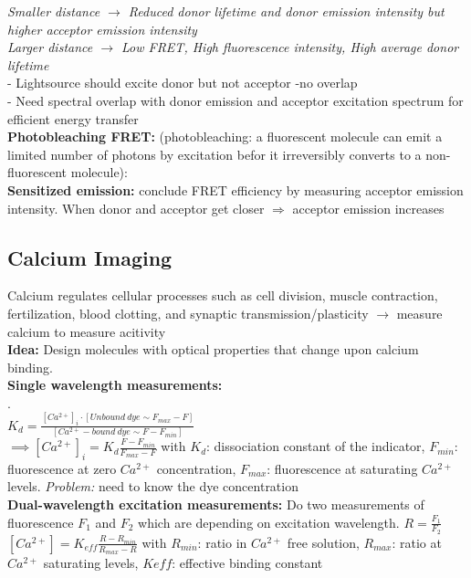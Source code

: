 \documentclass[9pt]{article}
\begin{document}
\begin{multicols}{2}
\emph{Smaller distance $\rightarrow$ Reduced donor lifetime and donor emission intensity but higher acceptor emission intensity}\\
\emph{Larger distance $\rightarrow$ Low FRET, High fluorescence intensity, High average donor lifetime}\\
- Lightsource should excite donor but not acceptor -no overlap\\
- Need spectral overlap with donor emission and acceptor excitation spectrum for efficient energy transfer\\
\textbf{Photobleaching FRET:} (photobleaching: a fluorescent molecule can emit a limited number of photons by excitation befor it irreversibly converts to a non-fluorescent molecule):\\
\textbf{Sensitized emission:}
conclude FRET efficiency by measuring acceptor emission intensity. When donor and acceptor get
closer $\Rightarrow$ acceptor emission increases


\subsection{Calcium Imaging}
Calcium regulates cellular processes such as cell
division, muscle contraction, fertilization, blood
clotting, and synaptic transmission/plasticity $\rightarrow$ measure calcium to measure acitivity\\
\textbf{Idea:} Design molecules with optical properties that change upon calcium binding.\\
\textbf{Single wavelength measurements: }\\
.\\
$K_d=\frac{[Ca^{2+}]_i\cdot [Unbound\ dye \sim F_{max}-F]}{[Ca^{2+}-bound\ dye \sim F-F_{min}]}$\\
$\implies [Ca^{2+}]_i =K_d\frac{F-F_{min}}{F_{max}-F}$ with $K_d$: dissociation constant of the indicator, $F_{min}$: fluorescence at zero $Ca^{2+}$ concentration, $F_{max}$: fluorescence at saturating $Ca^{2+}$ levels. \emph{Problem:} need to know the dye concentration\\
\textbf{Dual-wavelength excitation measurements: } Do two measurements of fluorescence $F_1$ and $F_2$ which are depending on excitation wavelength. $R=\frac{F_1}{F_2}$\\
$[Ca^{2+}]=K_{eff} \frac{R-R_{min}}{R_{max}-R}$ with $R_{min}$: ratio in $Ca^{2+}$ free solution, $R_{max}$: ratio at $Ca^{2+}$ saturating levels, $K{eff}$: effective binding constant

\end{multicols}
\end{document}
